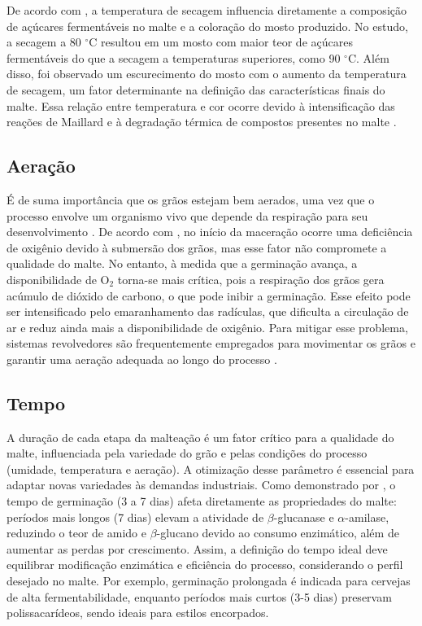 De acordo com , a temperatura de secagem influencia diretamente a composição de açúcares fermentáveis no malte e a coloração do mosto produzido. No estudo, a secagem a 80 $^{\circ}$C resultou em um mosto com maior teor de açúcares fermentáveis do que a secagem a temperaturas superiores, como 90 $^{\circ}$C. Além disso, foi observado um escurecimento do mosto com o aumento da temperatura de secagem, um fator determinante na definição das características finais do malte. Essa relação entre temperatura e cor ocorre devido à intensificação das reações de Maillard e à degradação térmica de compostos presentes no malte \cite{KUNZE1996}.

\subsection{Aeração}

É de suma importância que os grãos estejam bem aerados, uma vez que o processo envolve um organismo vivo que depende da respiração para seu desenvolvimento \cite{MALLETT2022}. De acordo com , no início da maceração ocorre uma deficiência de oxigênio devido à submersão dos grãos, mas esse fator não compromete a qualidade do malte. No entanto, à medida que a germinação avança, a disponibilidade de O$_2$ torna-se mais crítica, pois a respiração dos grãos gera acúmulo de dióxido de carbono, o que pode inibir a germinação. Esse efeito pode ser intensificado pelo emaranhamento das radículas, que dificulta a circulação de ar e reduz ainda mais a disponibilidade de oxigênio. Para mitigar esse problema, sistemas revolvedores são frequentemente empregados para movimentar os grãos e garantir uma aeração adequada ao longo do processo \cite{CENCI2021}. 

\subsection{Tempo}
A duração de cada etapa da malteação é um fator crítico para a qualidade do malte, influenciada pela variedade do grão e pelas condições do processo (umidade, temperatura e aeração). A otimização desse parâmetro é essencial para adaptar novas variedades às demandas industriais. Como demonstrado por , o tempo de germinação (3 a 7 dias) afeta diretamente as propriedades do malte: períodos mais longos (7 dias) elevam a atividade de $\beta$-glucanase e $\alpha$-amilase, reduzindo o teor de amido e $\beta$-glucano devido ao consumo enzimático, além de aumentar as perdas por crescimento. Assim, a definição do tempo ideal deve equilibrar modificação enzimática e eficiência do processo, considerando o perfil desejado no malte. Por exemplo, germinação prolongada é indicada para cervejas de alta fermentabilidade, enquanto períodos mais curtos (3-5 dias) preservam polissacarídeos, sendo ideais para estilos encorpados.

